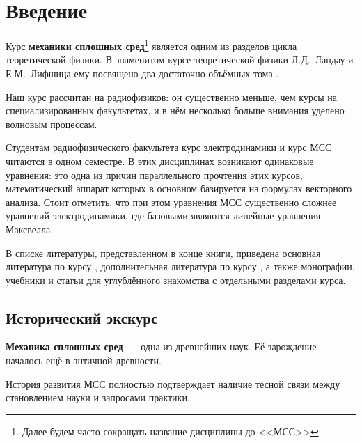 

\section{Введение}

Курс \textbf{механики сплошных сред}\footnote{Далее будем часто сокращать название дисциплины до <<МСС>>} является одним из разделов цикла теоретической физики.  В знаменитом курсе теоретической физики Л.Д.~Ландау и Е.М.~Лифшица  ему посвящено два достаточно объёмных тома \cite{nu1}.

Наш курс рассчитан на радиофизиков: он существенно меньше, чем курсы на специализированных факультетах, и в нём несколько больше внимания уделено волновым процессам.

Студентам радиофизического факультета курс электродинамики и курс МСС читаются в одном семестре. В этих дисциплинах возникают одинаковые уравнения: это одна из причин параллельного прочтения этих курсов, математический аппарат которых в основном базируется на формулах векторного анализа. Стоит отметить, что при этом уравнения МСС существенно сложнее уравнений электродинамики, где базовыми являются линейные уравнения Максвелла.

В списке литературы, представленном в конце книги, приведена основная литература по курсу \cite{nu1,nu2,nu3,nu4, nu5}, дополнительная литература по курсу \cite{nu6, nu7, nu8, nu9, nu10, nu11, nu12, nu13, nu14}, а также монографии, учебники и статьи для углублённого знакомства с отдельными разделами курса.

\subsection{Исторический экскурс}
\textbf{Механика сплошных сред}~--- одна из древнейших наук. Её зарождение началось ещё в античной древности.

История развития МСС полностью подтверждает наличие тесной связи между становлением науки и запросами практики.

